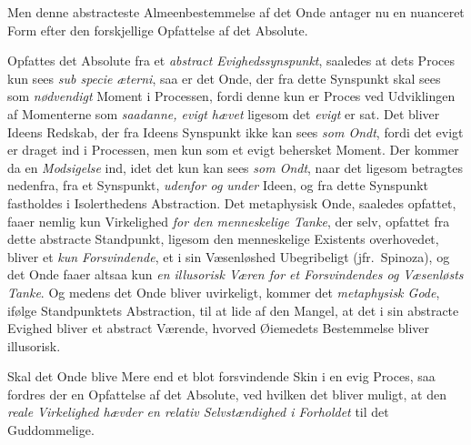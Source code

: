 Men denne abstracteste Almeenbestemmelse af det Onde antager nu en nuanceret
Form efter den forskjellige Opfattelse af det Absolute.

Opfattes det Absolute fra et \emph{abstract Evighedssynspunkt}, saaledes at dets
Proces kun sees \emph{\textit{sub specie}}
 \emph{\textit{æterni}}, saa er det Onde, der fra dette Synspunkt skal sees som
\emph{nødvendigt} Moment i Processen, fordi denne kun er Proces ved Udviklingen
af Momenterne som \emph{saadanne, evigt hævet} ligesom det \emph{evigt} er sat.
Det bliver Ideens Redskab, der fra Ideens Synspunkt ikke kan sees \emph{som
Ondt}, fordi det evigt er draget ind i Processen, men kun som et evigt behersket
Moment. Der kommer da en \emph{Modsigelse} ind, idet det kun kan sees \emph{som
Ondt}, naar det ligesom betragtes nedenfra, fra et Synspunkt, \emph{udenfor og
under} Ideen, og fra dette Synspunkt fastholdes i Isolerthedens Abstraction. Det
metaphysisk Onde, saaledes opfattet, faaer nemlig kun Virkelighed \emph{for den
menneskelige Tanke}, der selv, opfattet fra dette abstracte Standpunkt, ligesom
den menneskelige Existents overhovedet, bliver et \emph{kun Forsvindende}, et i
sin Væsenløshed Ubegribeligt (jfr.\ Spinoza), og det Onde faaer altsaa kun
\emph{en illusorisk Væren for et Forsvindendes og Væsenløsts Tanke}. Og medens
det Onde bliver uvirkeligt, kommer det \emph{metaphysisk Gode}, ifølge
Standpunktets Abstraction, til at lide af den Mangel, at det i sin abstracte
Evighed bliver et abstract Værende, hvorved Øiemedets Bestemmelse bliver
illusorisk.

Skal det Onde blive Mere end et blot forsvindende Skin i en evig Proces, saa
fordres der en Opfattelse af det Absolute, ved hvilken det bliver muligt, at den
\emph{reale Virkelighed hævder en relativ Selvstændighed i Forholdet} til det
Guddommelige.

